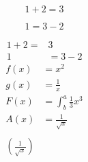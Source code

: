 \documentclass{article}
\begin{document}
\begin{equation*}
  1 + 2 = 3 
\end{equation*}

\begin{equation*}
  1 = 3 - 2
\end{equation*}

\begin{align*}
  1 + 2=& 3\\
  1 &= 3 - 2
\end{align*}
\begin{align}
f(x) &= x^2\\
g(x) &= \frac{1}{x}\\
F(x) &= \int^a_b \frac{1}{3}x^3\\
A(x )&=\frac{1}{\sqrt{x}}\\\\
\left(\frac{1}{\sqrt{x}}\right)\\
\end{align}
\end{document}

